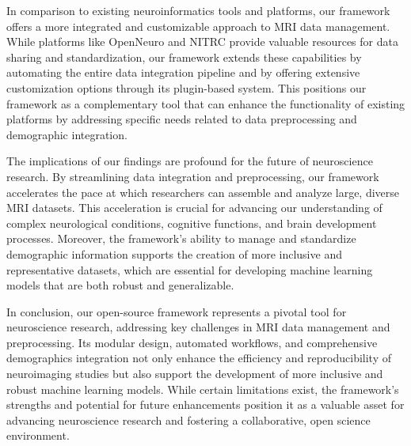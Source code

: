 In comparison to existing neuroinformatics tools and platforms, our framework offers a more integrated and 
customizable approach to MRI data management. While platforms like OpenNeuro and NITRC provide valuable 
resources for data sharing and standardization, our framework extends these capabilities by automating the 
entire data integration pipeline and by offering extensive customization options through its plugin-based 
system. This positions our framework as a complementary tool that can enhance the functionality of existing 
platforms by addressing specific needs related to data preprocessing and demographic integration.

The implications of our findings are profound for the future of neuroscience research. By streamlining data 
integration and preprocessing, our framework accelerates the pace at which researchers can assemble and analyze 
large, diverse MRI datasets. This acceleration is crucial for advancing our understanding of complex neurological 
conditions, cognitive functions, and brain development processes. Moreover, the framework's ability to manage 
and standardize demographic information supports the creation of more inclusive and representative datasets, 
which are essential for developing machine learning models that are both robust and generalizable.

In conclusion, our open-source framework represents a pivotal tool for neuroscience research, addressing key 
challenges in MRI data management and preprocessing. Its modular design, automated workflows, and comprehensive 
demographics integration not only enhance the efficiency and reproducibility of neuroimaging studies but also 
support the development of more inclusive and robust machine learning models. While certain limitations exist, 
the framework's strengths and potential for future enhancements position it as a valuable asset for advancing 
neuroscience research and fostering a collaborative, open science environment.
